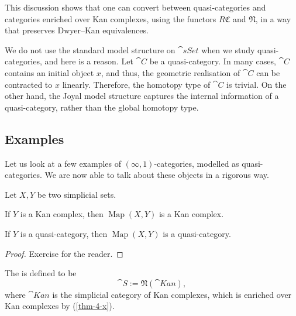 This discussion shows that one can convert between
quasi-categories and categories enriched over Kan complexes,
using the functors $R\mathfrak C$ and $\mathfrak N$,
in a way that preserves Dwyer--Kan equivalences.

\begin{remark}
    We do not use the standard model structure on $\cat{sSet}$
    when we study quasi-categories, and here is a reason.
    Let $\cat C$ be a quasi-category.
    In many cases, $\cat C$ contains an initial object $x$,
    and thus, the geometric realisation of $\cat C$ 
    can be contracted to $x$ linearly.
    Therefore, the homotopy type of $\cat C$ is trivial.
    On the other hand, the Joyal model structure 
    captures the internal information of a quasi-category,
    rather than the global homotopy type. \varqed
\end{remark}

\subsection{Examples}

Let us look at a few examples of $(\infty,1)$-categories,
modelled as quasi-categories.
We are now able to talk about these objects in a rigorous way.

\begin{proposition}\label{thm-4-x}
    Let $X,Y$ be two simplicial sets.
    \begin{itms}
        \item If $Y$ is a Kan complex,
        then $\operatorname{Map}(X,Y)$ is a Kan complex.
        \item If $Y$ is a quasi-category,
        then $\operatorname{Map}(X,Y)$ is a quasi-category.
    \end{itms}
\end{proposition}

\begin{proof}
    Exercise for the reader.
\end{proof}

\begin{example}
    The  is defined to be
    \[\cat S:=\mathfrak N(\cat{Kan}),\]
    where $\cat{Kan}$ is the simplicial category of Kan complexes,
    which is enriched over Kan complexes by (\ref{thm-4-x}).
    \varqed
\end{example}

